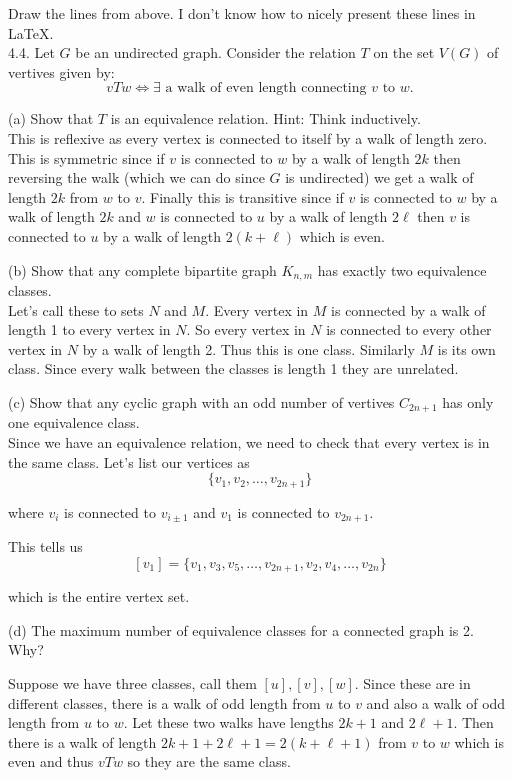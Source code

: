 \documentclass[16 pt]{amsart}
\theoremstyle{definition}
\theoremstyle{remark}
\numberwithin{equation}{subsection}
\begin{document}
Draw the lines from above.  I don't know how to nicely present these lines in \LaTeX.\\



4.4. Let $G$ be an undirected graph.  Consider the relation $T$ on the set $V(G)$ of vertives given by:
\[
v T w \iff \exists \text{ a walk of even length connecting } v \text{ to } w.
\]

(a) Show that $T$ is an equivalence relation. Hint: Think inductively.\\


This is reflexive as every vertex is connected to itself by a walk of length zero.  This is symmetric since if $v$ is connected to $w$ by a walk of length $2k$ then reversing the walk (which we can do since $G$ is undirected) we get a walk of length $2k$ from $w$ to $v$.  Finally this is transitive since if $v$ is connected to $w$ by a walk of length $2k$ and $w$ is connected to $u$ by a walk of length $2\ell$ then $v$ is connected to $u$ by a walk of length $2(k+\ell)$ which is even.



(b) Show that any complete bipartite graph $K_{n,m}$ has exactly two equivalence classes.\\

Let's call these to sets $N$ and $M$.  Every vertex in $M$ is connected by a walk of length 1 to every vertex in $N$.  So every vertex in $N$ is connected to every other vertex in $N$ by a walk of length 2.  Thus this is one class.  Similarly $M$ is its own class.  Since every walk between the classes is length 1 they are unrelated.


(c) Show that any cyclic graph with an odd number of vertives $C_{2n+1}$ has only one equivalence class.\\


Since we have an equivalence relation, we need to check that every vertex is in the same class.  Let's list our vertices as
\[
\{v_1,v_2,\dots,v_{2n+1} \}
\]

where $v_i$ is connected to $v_{i\pm 1}$ and $v_1$ is connected to $v_{2n+1}$.


This tells us
\[
[v_1] = \{v_1,v_3,v_5,\dots,v_{2n+1},v_2,v_4,\dots, v_{2n} \}
\]

which is the entire vertex set.




(d) The maximum number of equivalence classes for a connected graph is 2.  Why?


Suppose we have three classes, call them $[u],[v],[w]$.  Since these are in different classes, there is a walk of odd length from $u$ to $v$ and also a walk of odd length from $u$ to $w$.  Let these two walks have lengths $2k+1$ and $2\ell+1$.  Then there is a walk of length $2k+1+2\ell+1 = 2(k+\ell+1)$ from $v$ to $w$ which is even and thus $vTw$ so they are the same class.
\end{document}
